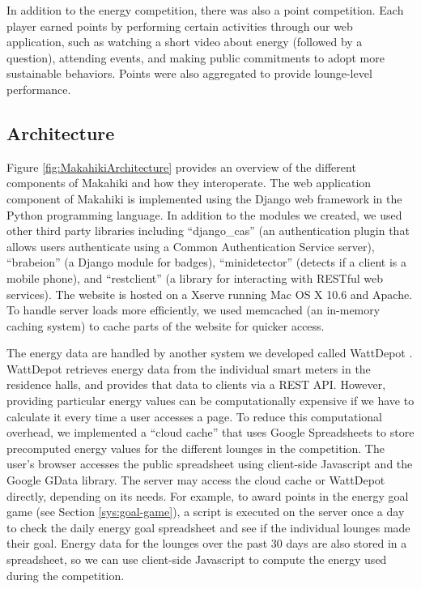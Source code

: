 \documentclass{acm_proc_article-sp}
\begin{document}
In addition to the energy competition, there was also a point competition. Each player earned points by performing certain activities through our web application, such as watching a short video about energy (followed by a question), attending events, and making public commitments to adopt more sustainable behaviors. Points were also aggregated to provide lounge-level performance.

\subsection{Architecture}
\label{sys:Architecture}

Figure \ref{fig:MakahikiArchitecture} provides an overview of the different components of Makahiki and how they interoperate. The web application component of Makahiki is implemented using the Django web framework in the Python programming language. In addition to the modules we created, we used other third party libraries including ``django\_cas'' (an authentication plugin that allows users authenticate using a Common Authentication Service server), ``brabeion'' (a Django module for badges), ``minidetector'' (detects if a client is a mobile phone), and ``restclient'' (a library for interacting with RESTful web services). The website is hosted on a Xserve running Mac OS X 10.6 and Apache. To handle server loads more efficiently, we used memcached (an in-memory caching system) to cache parts of the website for quicker access.

The energy data are handled by another system we developed called WattDepot 
\cite{csdl2-10-05}. WattDepot retrieves energy data from the individual smart meters in the residence halls, and provides that data to clients via a REST API. However, providing particular energy values can be computationally expensive if we have to calculate it every time a user accesses a page. To reduce this computational overhead, we implemented a ``cloud cache'' that uses Google Spreadsheets to store precomputed energy values for the different lounges in the competition. The user's browser accesses the public spreadsheet using client-side Javascript and the Google GData library. The server may access the cloud cache or WattDepot directly, depending on its needs. For example, to award points in the energy goal game (see Section \ref{sys:goal-game}), a script is executed on the server once a day to check the daily energy goal spreadsheet and see if the individual lounges made their goal. Energy data for the lounges over the past 30 days are also stored in a spreadsheet, so we can use client-side Javascript to compute the energy used during the competition.
\end{document}
